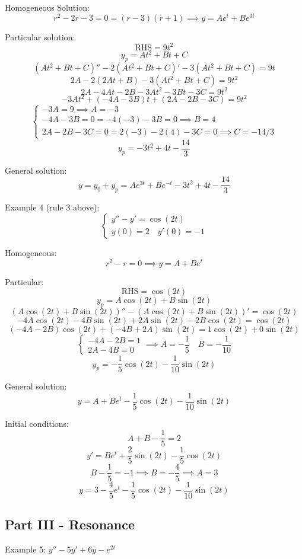 \documentclass[12pt]{article}
\begin{document}
Homogeneous Solution:
\[r^2 - 2r - 3 = 0 = (r - 3)(r + 1) \implies y = Ae^t + Be^{3t}\]

Particular solution:
\[\text{RHS} = 9t^2\] 
\[y_p = At^2 + Bt + C\]
\[(At^2 + Bt + C)'' - 2(At^2 + Bt + C)' - 3(At^2 + Bt + C) = 9t\]
\[2A - 2(2At + B) - 3(At^2 + Bt + C) = 9t^2\]
\[2A - 4At - 2B - 3At^2 - 3Bt -3C = 9t^2\]
\[-3At^2 + (-4A - 3B)t + (2A - 2B - 3C) = 9t^2\]
\[\begin{cases}
    -3A = 9 \implies A = -3\\
    -4A - 3B = 0 = -4(-3) - 3B = 0 \implies B = 4\\
    2A - 2B - 3C = 0 = 2(-3) - 2(4) - 3C = 0 \implies C = -14/3
\end{cases}\]
\[y_p = -3t^2 + 4t - \frac{14}{3}\]

General solution:
\[y = y_0 + y_p = \boxed{Ae^{3t} + Be^{-t} - 3t^2 + 4t - \frac{14}{3}}\]

Example 4 (rule 3 above):
\[\begin{cases}
    y'' - y' = \cos (2t)\\
    y(0) = 2 \quad y'(0) = -1
\end{cases}\]

Homogeneous:
\[r^2 - r = 0 \implies y = A + Be^t\]

Particular:
\[\text{RHS} = \cos (2t)\]
\[y_p = A\cos(2t) + B\sin(2t)\]
\[(A\cos(2t) + B\sin(2t))'' - (A\cos(2t) + B\sin(2t))' = \cos (2t)\]
\[-4A\cos(2t) -4B\sin(2t) + 2A\sin(2t) - 2B\cos (2t) = \cos (2t)\]
\[(-4A - 2B)\cos(2t) + (-4B + 2A)\sin(2t) = 1\cos(2t) + 0\sin(2t)\]
\[\begin{cases}
    -4A - 2B = 1\\
    2A - 4B = 0\end{cases} \implies A = -\frac{1}{5}\quad B = -\frac{1}{10}\]
\[y_p = -\frac{1}{5}\cos(2t) - \frac{1}{10}\sin (2t)\]

General solution:
\[y = A + Be^t - \frac{1}{5} \cos (2t) - \frac{1}{10} \sin (2t)\]

Initial conditions:
\[A + B - \frac{1}{5} = 2\]
\[y' = Be^t + \frac{2}{5}\sin (2t) - \frac{1}{5}\cos (2t)\]
\[B - \frac{1}{5} = -1 \implies B = -\frac{4}{5} \implies A = 3\]
\[\boxed{y} = 3 - \frac{4}{5}e^t - \frac{1}{5} \cos (2t) - \frac{1}{10}\sin(2t)\]

\subsection*{Part III - Resonance}
Example 5: $y'' - 5y' + 6y - e^{2t}$
\end{document}

